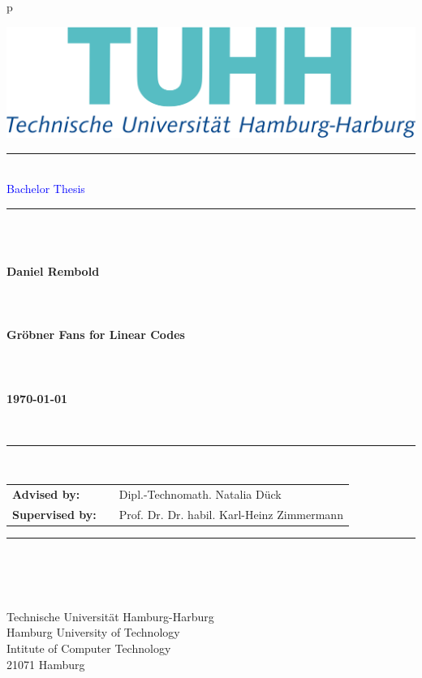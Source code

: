 \begin{tabular}{p{\textwidth}}
\begin{flushright}
\includegraphics[scale=0.15]{figures/tuhh.png}
\end{flushright}


\textcolor{gray}{\rule{15cm}{.8pt}}\\
\large{\textsf{\textcolor{blue}{Bachelor Thesis}}} \\
\textcolor{gray}{\rule{15cm}{.8pt}}

~\\
~\\



\begin{flushright}
\textbf{\LARGE{Daniel Rembold}}
~\\
~\\
~\\
~\\
\textbf{\LARGE{Gröbner Fans for Linear Codes}}
~\\
~\\
~\\
~\\
\textbf{\large{\today}}
\end{flushright}

~\\
\begin{center}
\textcolor{gray}{\rule{15cm}{.8pt}}\\
\begin{tabular}{lll}
\textbf{Advised by:} & & Dipl.-Technomath. Natalia D\"uck \\
\textbf{Supervised by:} & & Prof. Dr. Dr. habil. Karl-Heinz Zimmermann\\
\end{tabular}
\textcolor{gray}{\rule{15cm}{.8pt}}\\
\end{center}

~\\
~\\

Technische Universität Hamburg-Harburg\\
Hamburg University of Technology\\
Intitute of Computer Technology \\
21071 Hamburg

\end{tabular}


